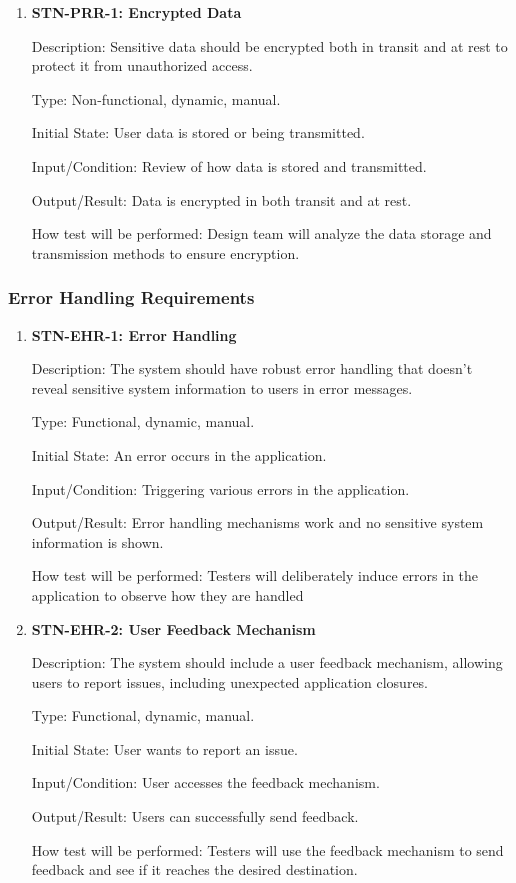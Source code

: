 \documentclass[12pt, titlepage]{article}
\begin{document}
    \begin{enumerate}
        \item {\textbf{STN-PRR-1: Encrypted Data}}

        Description: Sensitive data should be encrypted both in transit and at rest to protect it from unauthorized access.

        Type: Non-functional, dynamic, manual.

        Initial State: User data is stored or being transmitted.

        Input/Condition: Review of how data is stored and transmitted.

        Output/Result: Data is encrypted in both transit and at rest.

        How test will be performed: Design team will analyze the data storage and transmission methods to ensure encryption.

    \end{enumerate}


    \subsubsection{Error Handling Requirements}

    \begin{enumerate}

        \item {\textbf{STN-EHR-1: Error Handling}}

        Description: The system should have robust error handling that doesn’t reveal sensitive system information to users in error messages.

        Type: Functional, dynamic, manual.

        Initial State: An error occurs in the application.

        Input/Condition: Triggering various errors in the application.

        Output/Result: Error handling mechanisms work and no sensitive system information is shown.

        How test will be performed: Testers will deliberately induce errors in the application to observe how they are handled

        \item{\textbf{STN-EHR-2: User Feedback Mechanism}}

        Description: The system should include a user feedback mechanism, allowing users to report issues, including unexpected application closures.

        Type: Functional, dynamic, manual.

        Initial State: User wants to report an issue.

        Input/Condition: User accesses the feedback mechanism.

        Output/Result: Users can successfully send feedback.

        How test will be performed: Testers will use the feedback mechanism to send feedback and see if it reaches the desired destination.

    \end{enumerate}
\end{document}
